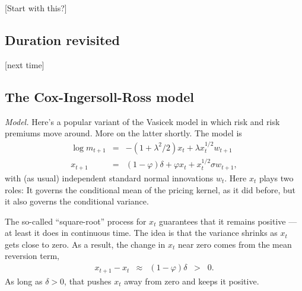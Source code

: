 \documentclass[11pt]{article}
\begin{document}
[Start with this?]


\subsection*{Duration revisited}


[next time]


\subsection*{The Cox-Ingersoll-Ross model}


{\it Model.\/}
Here's a popular variant of the Vasicek model
in which risk and risk premiums move around.
More on the latter shortly.
The model is
\begin{eqnarray*}
    \log m_{t+1} &=& - (1+\lambda^2/2 ) x_t + \lambda x_t^{1/2} w_{t+1} \\
         x_{t+1} &=& (1-\varphi) \delta + \varphi x_t + x_t^{1/2} \sigma w_{t+1} ,
\end{eqnarray*}
with (as usual) independent standard normal innovations $w_t$.
Here $x_t$ plays two roles:  It governs the conditional mean
of the pricing kernel, as it did before,
but it also governs the conditional variance.

The so-called ``square-root'' process for $x_t$ guarantees that
it remains positive --- at least it does in continuous time.
The idea is that the variance shrinks as $x_t$ gets close to zero.
As a result, the change in $x_t$ near zero comes from the mean reversion term,
\begin{eqnarray*}
       x_{t+1} - x_t  &\approx& (1-\varphi) \delta  \;\;>\;\; 0.
\end{eqnarray*}
As long as $\delta>0$, that pushes $x_t$ away from zero and keeps it positive.
\end{document}
